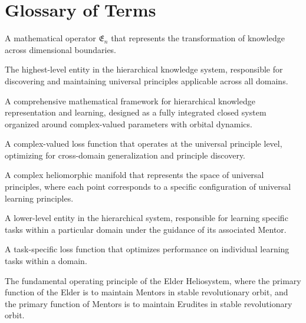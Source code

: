 \chapter*{Glossary of Terms}

\begin{description}[leftmargin=2cm, style=nextline]
    \item[Elder Operator] A mathematical operator $\mathfrak{E}_{n}$ that represents the transformation of knowledge across dimensional boundaries.
    
    \item[Elder] The highest-level entity in the hierarchical knowledge system, responsible for discovering and maintaining universal principles applicable across all domains.
    
    \item[Elder Heliosystem] A comprehensive mathematical framework for hierarchical knowledge representation and learning, designed as a fully integrated closed system organized around complex-valued parameters with orbital dynamics.
    
    \item[Elder Loss] A complex-valued loss function that operates at the universal principle level, optimizing for cross-domain generalization and principle discovery.
    
    \item[Elder Manifold] A complex heliomorphic manifold that represents the space of universal principles, where each point corresponds to a specific configuration of universal learning principles.
    
    \item[Erudite] A lower-level entity in the hierarchical system, responsible for learning specific tasks within a particular domain under the guidance of its associated Mentor.
    
    \item[Erudite Loss] A task-specific loss function that optimizes performance on individual learning tasks within a domain.
    
    \item[Gravitational Stability] The fundamental operating principle of the Elder Heliosystem, where the primary function of the Elder is to maintain Mentors in stable revolutionary orbit, and the primary function of Mentors is to maintain Erudites in stable revolutionary orbit.
    

\end{description}
